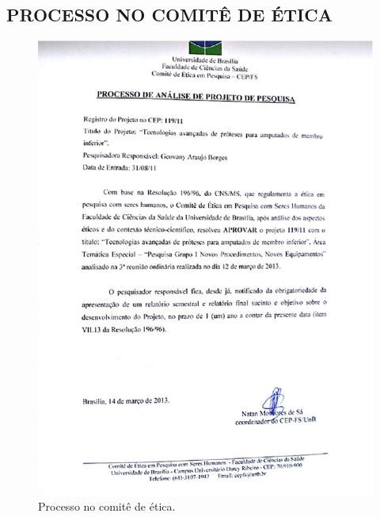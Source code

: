 \begin{anexosenv}

\partanexos

\chapter{PROCESSO NO COMITÊ DE ÉTICA}
\label{comite_sec}
\begin{figure}[ht]
	\centering
	\includegraphics[width=15cm]{figuras/comite.eps}
	\caption{Processo no comitê de ética.}
\label{comite}
\end{figure}


\end{anexosenv}


\printindex


